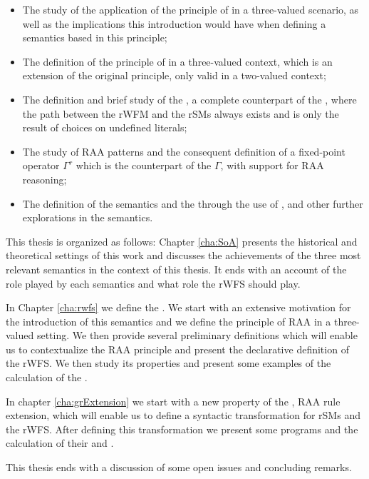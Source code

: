 \begin{itemize}
	\item The study of the application of the principle of \raa in a three-valued scenario, as well as the implications this introduction would have when defining a semantics based in this principle;
	\item The definition of the principle of \raa in a three-valued context, which is an extension of the original principle, only valid in a two-valued context;
	\item The definition and brief study of the \rpsms, a complete counterpart of the \psms, where the path between the rWFM and the rSMs always exists and is only the result of choices on undefined literals;
	\item The study of RAA patterns and the consequent definition of a fixed-point operator $\Gamma^{r}$ which is the counterpart of the \GFo $\Gamma$, with support for RAA reasoning;
	\item The definition of the \rsms semantics and the \rwfs through the use of \gro, and other further explorations in the \rsms semantics.
\end{itemize}


This thesis is organized as follows: Chapter \ref{cha:SoA} presents the historical and theoretical settings of this work and discusses the achievements of the three most relevant semantics in the context of this thesis. It ends with an account of the role played by each semantics and what role the rWFS should play.

In Chapter \ref{cha:rwfs} we define the \rwfs. We start with an extensive motivation for the introduction of this semantics and we define the principle of RAA in a three-valued setting. We then provide several preliminary definitions which will enable us to contextualize the RAA principle and present the declarative definition of the rWFS. We then study its properties and present some examples of the calculation of the \rwfm.

In chapter \ref{cha:grExtension} we start with a new property of the \rsms, RAA rule extension, which will enable us to define a syntactic transformation for rSMs and the rWFS. After defining this transformation we present some programs and the calculation of their \rsms and \rwfm.

This thesis ends with a discussion of some open issues and concluding remarks.
